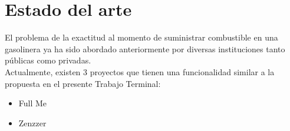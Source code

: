 \section{Estado del arte}
El problema de la exactitud al momento de suministrar combustible en una gasolinera ya ha sido abordado anteriormente por diversas instituciones tanto públicas como privadas.\\

Actualmente, existen 3 proyectos que tienen una funcionalidad similar a la propuesta en el presente Trabajo Terminal:
\begin{itemize}
	\item Full Me
	\item Zenzzer
\end{itemize}

